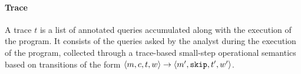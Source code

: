 \paragraph{Trace} 
A trace $t$ is a list of annotated queries accumulated along with the execution of the program. 
  It consists of the queries asked by the analyst during the execution of the program,
collected through
  a trace-based small-step operational semantics based on transitions of the form $ \langle m,c, t, w \rangle \to \langle m', \mathtt{skip}, t', w' \rangle $.
